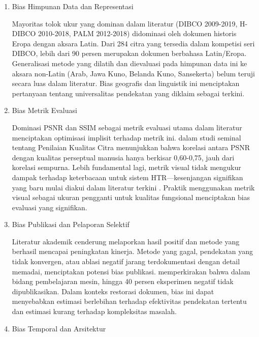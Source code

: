 \begin{enumerate}[leftmargin=*, labelindent=0pt, itemsep=1ex, topsep=0pt]

\item Bias Himpunan Data dan Representasi
\label{para:bias-dataset}

Mayoritas tolok ukur yang dominan dalam literatur (DIBCO 2009-2019, H-DIBCO 2010-2018, PALM 2012-2018) didominasi oleh dokumen historis Eropa dengan aksara Latin. Dari 284 citra yang tersedia dalam kompetisi seri DIBCO, lebih dari 90 persen merupakan dokumen berbahasa Latin/Eropa. Generalisasi metode yang dilatih dan dievaluasi pada himpunan data ini ke aksara non-Latin (Arab, Jawa Kuno, Belanda Kuno, Sansekerta) belum teruji secara luas dalam literatur. Bias geografis dan linguistik ini menciptakan pertanyaan tentang universalitas pendekatan yang diklaim sebagai terkini.

\item Bias Metrik Evaluasi
\label{para:bias-metrik}

Dominasi PSNR dan SSIM sebagai metrik evaluasi utama dalam literatur menciptakan optimisasi implisit terhadap metrik ini. \parencite{wang2004} dalam studi seminal tentang Penilaian Kualitas Citra menunjukkan bahwa korelasi antara PSNR dengan kualitas perseptual manusia hanya berkisar 0,60-0,75, jauh dari korelasi sempurna. Lebih fundamental lagi, metrik visual tidak mengukur dampak terhadap keterbacaan untuk sistem HTR—kesenjangan signifikan yang baru mulai diakui dalam literatur terkini \parencite{jadhav2022}. Praktik menggunakan metrik visual sebagai ukuran pengganti untuk kualitas fungsional menciptakan bias evaluasi yang signifikan.

\item Bias Publikasi dan Pelaporan Selektif
\label{para:bias-publikasi}

Literatur akademik cenderung melaporkan hasil positif dan metode yang berhasil mencapai peningkatan kinerja. Metode yang gagal, pendekatan yang tidak konvergen, atau ablasi negatif jarang terdokumentasi dengan detail memadai, menciptakan potensi bias publikasi. \parencite{ferguson2012} memperkirakan bahwa dalam bidang pembelajaran mesin, hingga 40 persen eksperimen negatif tidak dipublikasikan. Dalam konteks restorasi dokumen, bias ini dapat menyebabkan estimasi berlebihan terhadap efektivitas pendekatan tertentu dan estimasi kurang terhadap kompleksitas masalah.

\item Bias Temporal dan Arsitektur
\label{para:bias-temporal}


\end{enumerate}
